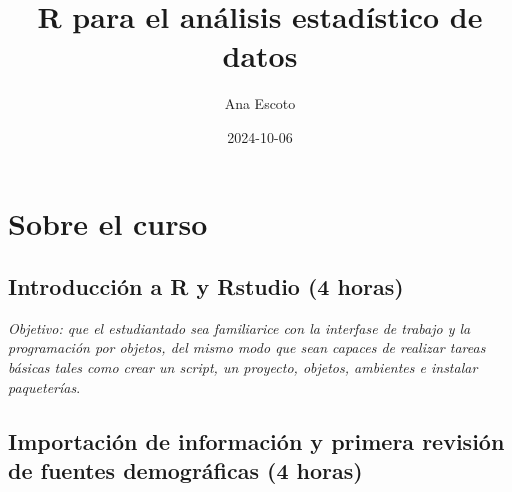 \documentclass[
  letterpaper,
  DIV=11,
  numbers=noendperiod]{scrreprt}
\title{R para el análisis estadístico de datos}
\author{Ana Escoto}
\date{2024-10-06}
\renewcommand*\contentsname{Table of contents}
\newcommand\contentsname{Table of contents}
\begin{document}
\maketitle
\ifdefined\Shaded\renewenvironment{Shaded}{\begin{tcolorbox}[frame hidden, breakable, sharp corners, enhanced, interior hidden, borderline west={3pt}{0pt}{shadecolor}, boxrule=0pt]}{\end{tcolorbox}}\fi

\renewcommand*\contentsname{Table of contents}
{
\hypersetup{linkcolor=}
\setcounter{tocdepth}{2}
\tableofcontents
}

\hypertarget{sobre-el-curso}{%
\chapter*{Sobre el curso}\label{sobre-el-curso}}


\hypertarget{introducciuxf3n-a-r-y-rstudio-4-horas}{%
\section*{Introducción a R y Rstudio (4
horas)}\label{introducciuxf3n-a-r-y-rstudio-4-horas}}


\emph{Objetivo: que el estudiantado sea familiarice con la interfase de
trabajo y la programación por objetos, del mismo modo que sean capaces
de realizar tareas básicas tales como crear un script, un proyecto,
objetos, ambientes e instalar paqueterías}.

\hypertarget{importaciuxf3n-de-informaciuxf3n-y-primera-revisiuxf3n-de-fuentes-demogruxe1ficas-4-horas}{%
\section*{Importación de información y primera revisión de fuentes
demográficas (4
horas)}\label{importaciuxf3n-de-informaciuxf3n-y-primera-revisiuxf3n-de-fuentes-demogruxe1ficas-4-horas}}

\end{document}
